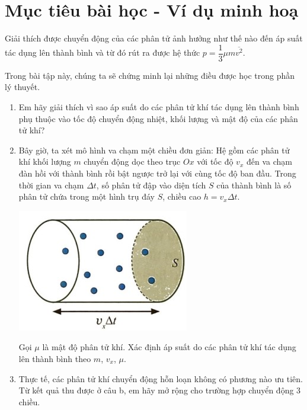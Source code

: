 \section{Mục tiêu bài học - Ví dụ minh hoạ}
\begin{dang}{Giải thích được chuyển động của các phân tử ảnh hưởng như thế nào đến áp suất tác dụng lên thành bình và từ đó rút ra được hệ thức $p=\dfrac{1}{3}\mu m\overline{v^2}$.}
	{Trong bài tập này, chúng ta sẽ chứng minh lại những điều được học trong phần lý thuyết.
		\begin{enumerate}[label=\alph*)]
			\item Em hãy giải thích vì sao áp suất do các phân tử khí tác dụng lên thành bình phụ thuộc vào tốc độ chuyển động nhiệt, khối lượng và mật độ của các phân tử khí?
			\item Bây giờ, ta xét mô hình va chạm một chiều đơn giản: Hệ gồm các phân tử khí khối lượng $m$ chuyển động dọc theo trục $Ox$ với tốc độ $v_x$ đến va chạm đàn hồi với thành bình rồi bật ngược trở lại với cùng tốc độ ban đầu. Trong thời gian va chạm $\Delta t$, số phân tử đập vào diện tích $S$ của thành bình là số phân tử chứa trong một hình trụ đáy $S$, chiều cao $h=v_x\Delta t$. 
			\begin{center}
				\includegraphics[width=0.3\linewidth]{../figs/VN12-Y24-PH-SYL-014-1}
			\end{center}
			Gọi $\mu$ là mật độ phân tử khí. Xác định áp suất do các phân tử khí tác dụng lên thành bình theo $m$, $v_x$, $\mu$.
			\item Thực tế, các phân tử khí chuyển động hỗn loạn không có phương nào ưu tiên. Từ kết quả thu được ở câu b, em hãy mở rộng cho trường hợp chuyển động 3 chiều.
		\end{enumerate}
		
}
\end{dang}
